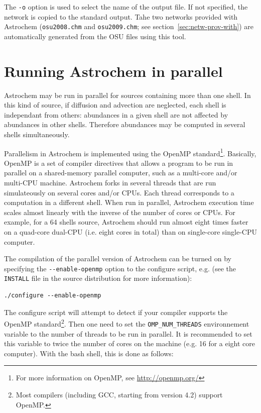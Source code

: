 \documentclass[a4paper,12pt]{article}
\begin{document}
\noindent
The \verb=-o= option is used to select the name of the output file. If
not specified, the network is copied to the standard output. Tahe two
networks provided with Astrochem (\verb=osu2008.chm= and
\verb=osu2009.chm=; see section~\ref{sec:netw-prov-with}) are
automatically generated from the OSU files using this tool.

\section{Running Astrochem in parallel}
\label{sec:runn-astr-parall}

Astrochem may be run in parallel for sources containing more than one
shell. In this kind of source, if diffusion and advection are
neglected, each shell is independant from others: abundances in a
given shell are not affected by abundances in other shells. Therefore
abundances may be computed in several shells simultaneously.

Parallelism in Astrochem is implemented using the OpenMP
standard\footnote{For more information on OpenMP, see
  \url{http://openmp.org/}}. Basically, OpenMP is a set of compiler
directives that allows a program to be run in parallel on a
shared-memory parallel computer, such as a multi-core and/or multi-CPU
machine. Astrochem forks in several threads that are run simulateously
on several cores and/or CPUs. Each thread corresponds to a computation
in a different shell. When run in parallel, Astrochem execution time
scales almost linearly with the inverse of the number of cores or
CPUs. For example, for a 64 shells source, Astrochem should run almost
eight times faster on a quad-core dual-CPU (i.e. eight cores in total)
than on single-core single-CPU computer.

The compilation of the parallel version of Astrochem can be turned on
by specifying the \verb=--enable-openmp= option to the configure
script, e.g. (see the \verb=INSTALL= file in the source distribution
for more information):

\begin{verbatim}
./configure --enable-openmp
\end{verbatim}
 
\noindent
The configure script will attempt to detect if your compiler supports
the OpenMP standard\footnote{Most compilers (including GCC, starting
  from version 4.2) support OpenMP.}. Then one need to set the
\verb=OMP_NUM_THREADS= environnement variable to the number of threads
to be run in parallel. It is recommended to set this variable to twice
the number of cores on the machine (e.g. 16 for a eight core
computer). With the bash shell, this is done as follows:
\end{document}

